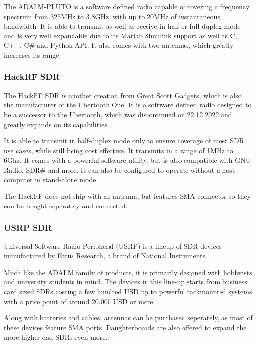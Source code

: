 The ADALM-PLUTO is a software defined radio capable of covering a frequency spectrum from 325MHz to 3.8GHz, with up to 20MHz of instantaneous bandwidth. It is able to transmit as well as receive in half or full duplex mode and is very well expandable due to its Matlab Simulink support as well as C, C++, C\# and Python API. It also comes with two antennas, which greatly increases its range.

\subsubsection{HackRF SDR}
The HackRF SDR is another creation from Great Scott Gadgets, which is also the manufacturer of the Ubertooth One. It is a software defined radio designed to be a successor to the Ubertooth, which was discontinued on 22.12.2022 and greatly expands on its capabilities.

It is able to transmit in half-duplex mode only to ensure coverage of most SDR use cases, while still being cost effective. It transmits in a range of 1MHz to 6Ghz. It comes with a powerful software utility, but is also compatible with GNU Radio, SDR\# and more. It can also be configured to operate without a host computer in stand-alone mode.

The HackRF does not ship with an antenna, but features SMA connector so they can be bought seperately and connected.

\subsubsection{USRP SDR}
Universal Software Radio Peripheral (USRP) is a lineup of SDR devices manufactured by Ettus Research, a brand of National Instruments.

Much like the ADALM family of products, it is primarily designed with hobbyists and university students in mind. The devices in this line-up starts from business card sized SDRs costing a few hundred USD up to powerful rackmounted systems with a price point of around 20.000 USD or more.

Along with batteries and cables, antennas can be purchased seperately, as most of these devices feature SMA ports. Daughterboards are also offered to expand the more higher-end SDRs even more.

